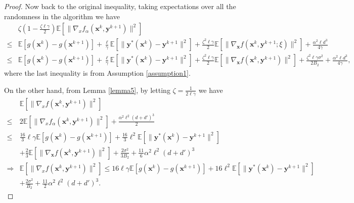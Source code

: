 \begin{proof}
    Now back to the original inequality, taking expectations over all the randomness in the algorithm we have 
    \begin{align*}
        & \zeta(1-\frac{\zeta\ell\gamma}{2})\mathbb{E}[\|\nabla_xf_\alpha({ \mathbf{x}}^k,{ \mathbf{y}}^{k+1})\|^2] \\
        \leq & \mathbb{E}[g({ \mathbf{x}}^{k})-g({ \mathbf{x}}^{k+1})] + \frac{\ell}{\gamma}\mathbb{E}[\|{ \mathbf{y}}^*({ \mathbf{x}}^k)-{ \mathbf{y}}^{k+1}\|^2] + \frac{\zeta^2\ell\gamma}{2}\mathbb{E}[\|\nabla_{ \mathbf{x}} f({ \mathbf{x}}^k,{ \mathbf{y}}^{k+1};\xi)\|^2]+\frac{\alpha^2 \ell d^3}{4\gamma} \\
        \leq & \mathbb{E}[g({ \mathbf{x}}^{k})-g({ \mathbf{x}}^{k+1})] + \frac{\ell}{\gamma}\mathbb{E}[\|{ \mathbf{y}}^*({ \mathbf{x}}^k)-{ \mathbf{y}}^{k+1}\|^2] + \frac{\zeta^2\ell\gamma}{2}\mathbb{E}[\|\nabla_{ \mathbf{x}} f({ \mathbf{x}}^k,{ \mathbf{y}}^{k+1})\|^2]+\frac{\zeta^2\ell\gamma\sigma^2}{2B_2}+\frac{\alpha^2 \ell d^3}{4\gamma},
    \end{align*}
    where the last inequality is from Assumption \ref{assumption1}.

    On the other hand, from Lemma \ref{lemma5}, by letting $\zeta=\frac{1}{2\ell\gamma}$ we have
    \begin{align*}
        & \mathbb{E}[\|\nabla_xf({ \mathbf{x}}^k,{ \mathbf{y}}^{k+1})\|^2] \\
        \leq & 2\mathbb{E}[\|\nabla_xf_\alpha({ \mathbf{x}}^k,{ \mathbf{y}}^{k+1})\|^2]+\frac{\alpha^2\ell^2(d+d')^3}{2} \\
        \leq & \frac{16}{3}\ell\gamma\mathbb{E}[g({ \mathbf{x}}^{k})-g({ \mathbf{x}}^{k+1})]+\frac{16}{3}\ell^2\mathbb{E}[\|{ \mathbf{y}}^*({ \mathbf{x}}^k)-{ \mathbf{y}}^{k+1}\|^2]\\
        & +\frac{2}{3}\mathbb{E}[\|\nabla_{ \mathbf{x}} f({ \mathbf{x}}^k,{ \mathbf{y}}^{k+1})\|^2]+\frac{2\sigma^2}{3B_2}+\frac{11}{6}\alpha^2\ell^2(d+d')^3 \\
        \Rightarrow & \mathbb{E}[\|\nabla_xf({ \mathbf{x}}^k,{ \mathbf{y}}^{k+1})\|^2] \leq 16\ell\gamma\mathbb{E}[g({ \mathbf{x}}^{k})-g({ \mathbf{x}}^{k+1})]+16\ell^2\mathbb{E}[\|{ \mathbf{y}}^*({ \mathbf{x}}^k)-{ \mathbf{y}}^{k+1}\|^2]\\
        & +\frac{2\sigma^2}{B_2}+\frac{11}{2}\alpha^2\ell^2(d+d')^3.
    \end{align*}



\end{proof}
